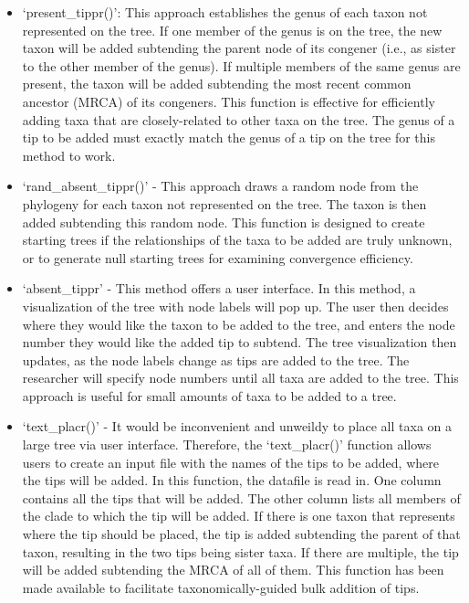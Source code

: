\documentclass[11pt]{article}
\begin{document}
\begin{itemize}
\item `present\_tippr()': This approach establishes the genus of each taxon not represented on the tree. 
If one member of the genus is on the tree, the new taxon will be added subtending the parent node of its congener (i.e., as sister to the other member of the genus). 
If multiple members of the same genus are present, the taxon will be added subtending the most recent common ancestor (MRCA) of its congeners.
This function is effective for efficiently adding taxa that are closely-related to other taxa on the tree.
The genus of a tip to be added must exactly match the genus of a tip on the tree for this method to work.

\item `rand\_absent\_tippr()' - This approach draws a random node from the phylogeny for each taxon not represented on the tree.
The taxon is then added subtending this random node.
This function is designed to create starting trees if the relationships of the taxa to be added are truly unknown, or to generate null starting trees for examining convergence efficiency.

\item `absent\_tippr' - This method offers a user interface.
In this method, a visualization of the tree with node labels will pop up. 
The user then decides where they would like the taxon to be added to the tree, and enters the node number they would like the added tip to subtend.
The tree visualization then updates, as the node labels change as tips are added to the tree. 
The researcher will specify node numbers until all taxa are added to the tree. 
This approach is useful for small amounts of taxa to be added to a tree.

\item `text\_placr()' - It would be inconvenient and unweildy to place all taxa on a large tree via user interface. 
Therefore, the `text\_placr()' function allows users to create an input file with the names of the tips to be added, where the tips will be added.
In this function, the datafile is read in. 
One column contains all the tips that will be added.
The other column lists all members of the clade to which the tip will be added.
If there is one taxon that represents where the tip should be placed, the tip is added subtending the parent of that taxon, resulting in the two tips being sister taxa.
If there are multiple, the tip will be added subtending the MRCA of all of them.
This function has been made available to facilitate taxonomically-guided bulk addition of tips.
\end{itemize}
\end{document}
